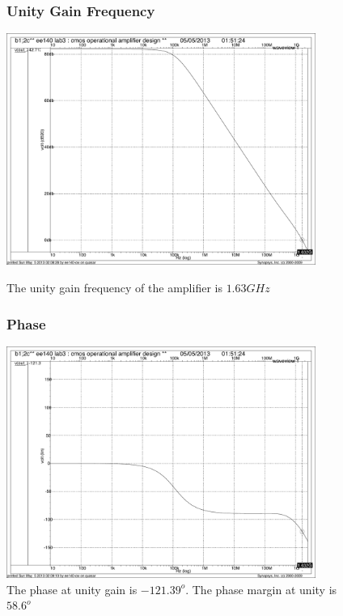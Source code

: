 \documentclass[]{article}
\begin{document}
		\begin{figure}
			\subsubsection{Unity Gain Frequency}
			\includegraphics[width=0.9\textwidth]{DC_GAIN_ugf_FINAL.pdf}
			\caption{The unity gain frequency of the amplifier is $1.63GHz$}
			\subsubsection{Phase}
			\includegraphics[width=0.9\textwidth]{DC_GAIN_phase_FINAL.pdf}
			\caption{The phase at unity gain is $-121.39^{o}$. The phase margin at unity is $58.6^{o}$}
		\end{figure}
		
\end{document}
